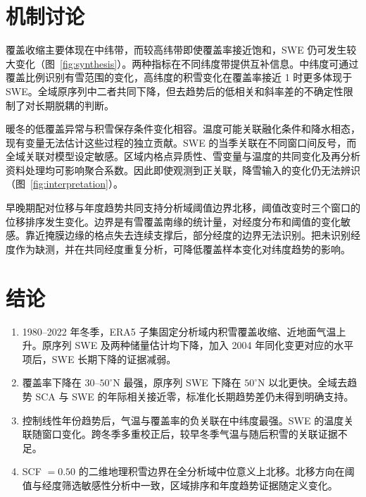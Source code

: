 \section{机制讨论}

覆盖收缩主要体现在中纬带，而较高纬带即使覆盖率接近饱和，SWE 仍可发生较大变化（图~\ref{fig:synthesis}）。两种指标在不同纬度带提供互补信息。中纬度可通过覆盖比例识别有雪范围的变化，高纬度的积雪变化在覆盖率接近 1 时更多体现于 SWE。全域原序列中二者共同下降，但去趋势后的低相关和斜率差的不确定性限制了对长期脱耦的判断。

暖冬的低覆盖异常与积雪保存条件变化相容。温度可能关联融化条件和降水相态，现有变量无法估计这些过程的独立贡献。SWE 的当季关联在不同窗口间反号，而全域关联对模型设定敏感。区域内格点异质性、雪变量与温度的共同变化及再分析资料处理均可影响聚合系数。因此即使观测到正关联，降雪输入的变化仍无法辨识（图~\ref{fig:interpretation}）。


早晚期配对位移与年度趋势共同支持分析域阈值边界北移，阈值改变时三个窗口的位移排序发生变化。边界是有雪覆盖南缘的统计量，对经度分布和阈值的变化敏感。靠近掩膜边缘的格点失去连续支撑后，部分经度的边界无法识别。把未识别经度作为缺测，并在共同经度重复分析，可降低覆盖样本变化对纬度趋势的影响。

\section{结论}

\begin{enumerate}
\item 1980--2022 年冬季，ERA5 子集固定分析域内积雪覆盖收缩、近地面气温上升。原序列 SWE 及两种储量估计均下降，加入 2004 年同化变更对应的水平项后，SWE 长期下降的证据减弱。
\item 覆盖率下降在 $30$--$50^\circ$N 最强，原序列 SWE 下降在 $50^\circ$N 以北更快。全域去趋势 SCA 与 SWE 的年际相关接近零，标准化长期趋势差仍未得到明确支持。
\item 控制线性年份趋势后，气温与覆盖率的负关联在中纬度最强。SWE 的温度关联随窗口变化。跨冬季多重校正后，较早冬季气温与随后积雪的关联证据不足。
\item SCF $=0.50$ 的二维地理积雪边界在全分析域中位意义上北移。北移方向在阈值与经度筛选敏感性分析中一致，区域排序和年度趋势证据随定义变化。
\end{enumerate}

